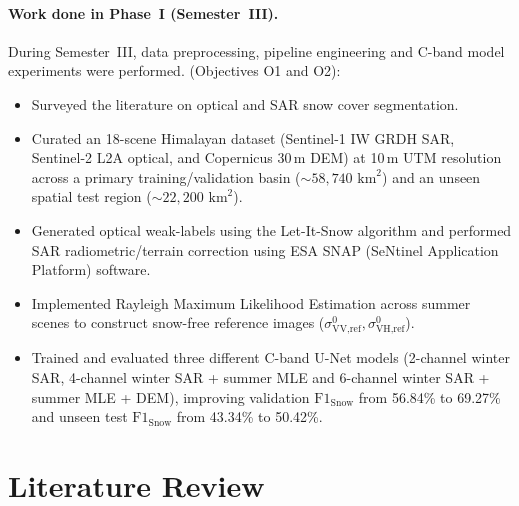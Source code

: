 \documentclass{article}
\newif\ifshowguide
\newcommand{\guide}[1]{%
  \ifshowguide
    \par\medskip\noindent
    \fcolorbox{blue!50}{blue!4}{%
      \begin{minipage}{\dimexpr\linewidth-2\fboxsep-2\fboxrule\relax}
        \small\color{blue!55!black}\textbf{Guidance.} #1
      \end{minipage}}%
    \par\medskip
  \fi}
\begin{document}
\paragraph{Work done in Phase~I (Semester~III).}
During Semester~III, data preprocessing, pipeline engineering and C-band model experiments were performed. (Objectives O1 and O2):
\begin{itemize}
  \item Surveyed the literature on optical and SAR snow cover segmentation.
  \item Curated an 18-scene Himalayan dataset (Sentinel-1 IW GRDH SAR, Sentinel-2 L2A optical, and Copernicus 30\,m DEM) at 10\,m UTM resolution across a primary training/validation basin ($\sim 58{,}740\text{ km}^2$) and an unseen spatial test region ($\sim 22{,}200\text{ km}^2$).
  \item Generated optical weak-labels using the Let-It-Snow algorithm \citep{simon2018algorithm} and performed SAR radiometric/terrain correction using ESA SNAP (SeNtinel Application Platform) software.
  \item Implemented Rayleigh Maximum Likelihood Estimation across summer scenes to construct snow-free reference images ($\sigma^0_{\text{VV,ref}}, \sigma^0_{\text{VH,ref}}$).
  \item Trained and evaluated three different C-band U-Net models (2-channel winter SAR, 4-channel winter SAR + summer MLE and 6-channel winter SAR + summer MLE + DEM), improving validation $\text{F1}_{\text{Snow}}$ from 56.84\% to 69.27\% and unseen test $\text{F1}_{\text{Snow}}$ from 43.34\% to 50.42\%.
\end{itemize}

\section{Literature Review}
\label{sec:lit}

\guide{About 1--1.5 pages. Organise the review by \emph{theme or approach}, not
paper by paper; use \texttt{\textbackslash paragraph\{\}} headings for themes.
For each theme, say what the methods do, what they achieve and where they fall
short. Prefer recent peer-reviewed work and key original papers; cite with
\texttt{\textbackslash citet} / \texttt{\textbackslash citep}. End with a short
paragraph titled \emph{Research gap} that states, in your own words, what is
missing and how your project addresses it. A comparison table of closely related
works is encouraged.}
\end{document}
